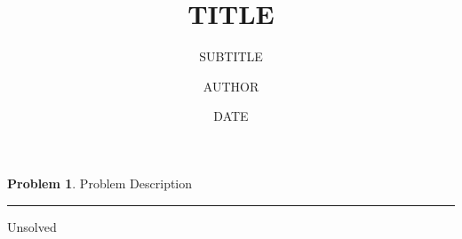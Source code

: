 \documentclass[11pt]{scrartcl}
\theoremstyle{definition}
\newtheorem*{problem*}{Problem}
\newcommand{\hrulebar}{
  \par\hspace{\fill}\rule{0.95\linewidth}{.7pt}\hspace{\fill}
  \par\nointerlineskip \vspace{\baselineskip}
}
\begin{document}
    
\title{TITLE}
\subtitle{SUBTITLE} %
\author{AUTHOR}
\date{DATE}

\maketitle

\begin{problem*}
Problem Description
\end{problem*}

\hrulebar

Unsolved
\end{document}
